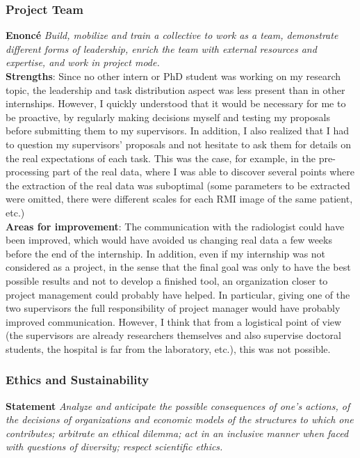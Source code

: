 \documentclass[preprint,12pt]{elsarticle}
\begin{document}
\subsubsection{Project Team}

\noindent \textbf{Enoncé} \textit{Build, mobilize and train a collective to work as a team, demonstrate different forms of leadership, enrich the team with external resources and expertise, and work in project mode.}\\[3 pt]

\noindent \textbf{Strengths}: Since no other intern or PhD student was working on my research topic, the leadership and task distribution aspect was less present than in other internships. However, I quickly understood that it would be necessary for me to be proactive, by regularly making decisions myself and testing my proposals before submitting them to my supervisors. In addition, I also realized that I had to question my supervisors' proposals and not hesitate to ask them for details on the real expectations of each task. This was the case, for example, in the pre-processing part of the real data, where I was able to discover several points where the extraction of the real data was suboptimal (some parameters to be extracted were omitted, there were different scales for each RMI image of the same patient, etc.)\\[3 pt]

\noindent \textbf{Areas for improvement}: The communication with the radiologist could have been improved, which would have avoided us changing real data a few weeks before the end of the internship. In addition, even if my internship was not considered as a project, in the sense that the final goal was only to have the best possible results and not to develop a finished tool, an organization closer to project management could probably have helped. In particular, giving one of the two supervisors the full responsibility of project manager would have probably improved communication. However, I think that from a logistical point of view (the supervisors are already researchers themselves and also supervise doctoral students, the hospital is far from the laboratory, etc.), this was not possible.

\subsubsection{Ethics and Sustainability}

\noindent \textbf{Statement} \textit{Analyze and anticipate the possible consequences of one's actions, of the decisions of organizations and economic models of the structures to which one contributes; arbitrate an ethical dilemma; act in an inclusive manner when faced with questions of diversity; respect scientific ethics.}\\[3 pt]
\end{document}
